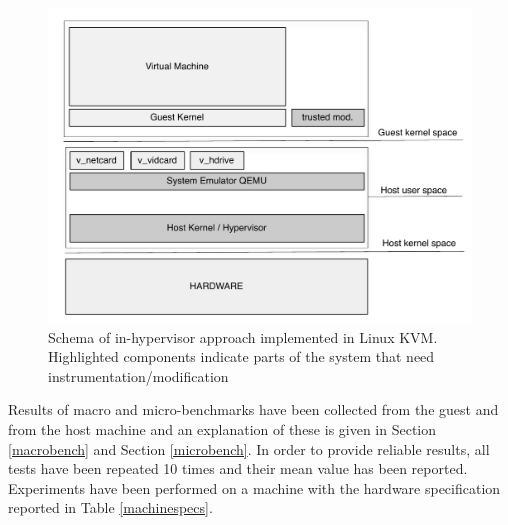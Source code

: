 \begin{figure}
\begin{center}
\includegraphics[scale=0.5]{images/hellorootkitty_schema.pdf}
\caption{Schema of in-hypervisor approach implemented in Linux KVM. Highlighted components indicate parts of the system that need instrumentation/modification}
\label{hellorootkitty_schema}
\end{center}
\end{figure}


Results of macro and micro-benchmarks have been collected from the guest and from the host machine and an explanation of these is given in Section \ref{macrobench} and Section \ref{microbench}.
In order to provide reliable results, all tests have been repeated 10 times and their mean value has been reported. Experiments have been performed on a machine with the hardware specification reported in Table \ref{machinespecs}.

%


